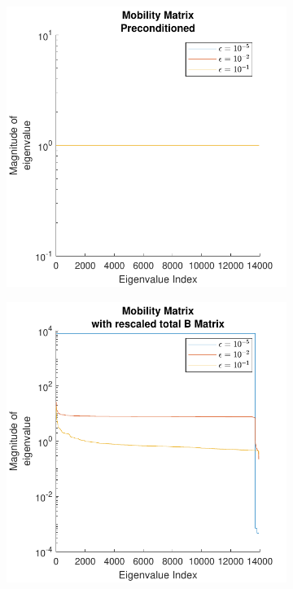 \begin{figure}
\ContinuedFloat
    \begin{subfigure}{0.45\textwidth}
        \centering
        \includegraphics[width=\linewidth]{Images/Condition/Eigen-Mobility Matrix Preconditioned.pdf}
    \end{subfigure}
    \hfill
    \begin{subfigure}{0.45\textwidth}
        \centering
        \includegraphics[width=\linewidth]{Images/Condition/Eigen-Mobility Matrix with rescaled total B Matrix.pdf}
    \end{subfigure}
\end{figure}

